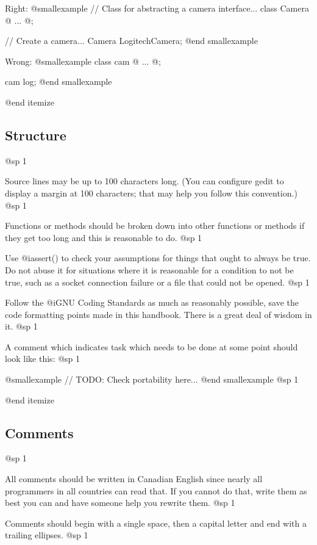 Right:
@smallexample
// Class for abstracting a camera interface...
class Camera
@{
    ...
@};

// Create a camera...
Camera LogitechCamera;
@end smallexample

Wrong:
@smallexample
class cam
@{
    ...
@};

cam log;
@end smallexample

@end itemize

\subsection{Structure}
@sp 1
\itemize
\item
Source lines may be up to 100 characters long. (You can configure gedit to display a margin at 100 characters; that may help you follow this convention.)
@sp 1

\item
Functions or methods should be broken down into other functions or methods if they get too long and this is reasonable to do.
@sp 1

\item
Use @i{assert()} to check your assumptions for things that ought to always be true. Do not abuse it for situations where it is reasonable for a condition to not be true, such as a socket connection failure or a file that could not be opened.
@sp 1

\item
Follow the @i{GNU Coding Standards} as much as reasonably possible, save the code formatting points made in this handbook. There is a great deal of wisdom in it.
@sp 1

\item
A comment which indicates task which needs to be done at some point should look like this: 
@sp 1

@smallexample
// TODO: Check portability here...
@end smallexample
@sp 1

@end itemize

\subsection{Comments}
@sp 1

\itemize
\item
All comments should be written in Canadian English since nearly all programmers in all countries can read that. If you cannot do that, write them as best you can and have someone help you rewrite them.
@sp 1

\item
Comments should begin with a single space, then a capital letter and end with a trailing ellipses. 
@sp 1

